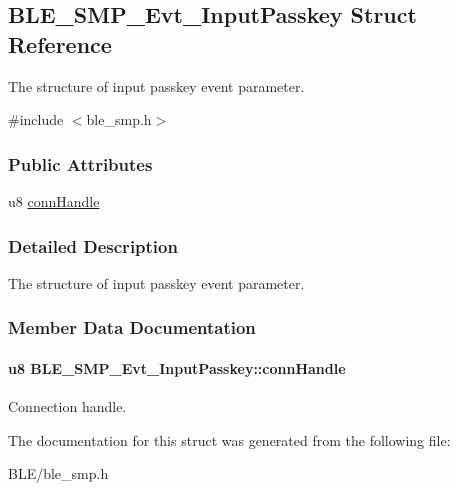 \hypertarget{struct_b_l_e___s_m_p___evt___input_passkey}{}\subsection{B\+L\+E\+\_\+\+S\+M\+P\+\_\+\+Evt\+\_\+\+Input\+Passkey Struct Reference}
\label{struct_b_l_e___s_m_p___evt___input_passkey}


The structure of input passkey event parameter.  




{\ttfamily \#include $<$ble\+\_\+smp.\+h$>$}

\subsubsection*{Public Attributes}
\begin{DoxyCompactItemize}
\item 
u8 \hyperlink{struct_b_l_e___s_m_p___evt___input_passkey_a5511cf09697e2ce5f64341b05b9faf91}{conn\+Handle}
\end{DoxyCompactItemize}


\subsubsection{Detailed Description}
The structure of input passkey event parameter. 

\subsubsection{Member Data Documentation}
\paragraph[{\texorpdfstring{conn\+Handle}{connHandle}}]{\setlength{\rightskip}{0pt plus 5cm}u8 B\+L\+E\+\_\+\+S\+M\+P\+\_\+\+Evt\+\_\+\+Input\+Passkey\+::conn\+Handle}\hypertarget{struct_b_l_e___s_m_p___evt___input_passkey_a5511cf09697e2ce5f64341b05b9faf91}{}\label{struct_b_l_e___s_m_p___evt___input_passkey_a5511cf09697e2ce5f64341b05b9faf91}
Connection handle. 

The documentation for this struct was generated from the following file\+:\begin{DoxyCompactItemize}
\item 
B\+L\+E/ble\+\_\+smp.\+h\end{DoxyCompactItemize}
